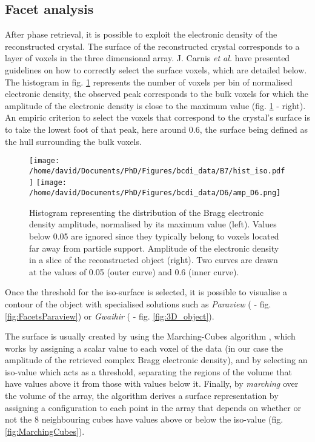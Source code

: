 \subsection{Facet analysis} \label{sec:FacetAnalysis}

After phase retrieval, it is possible to exploit the electronic density of the reconstructed crystal.
The surface of the reconstructed crystal corresponds to a layer of voxels in the three dimensional array.
J. Carnis \textit{et al.} \parencite*{Carnis2019} have presented guidelines on how to correctly select the surface voxels, which are detailed below.
The histogram in fig. \ref{fig:histo} represents the number of voxels per bin of normalised electronic density, the observed peak corresponds to the bulk voxels for which the amplitude of the electronic density is close to the maximum value (fig. \ref{fig:histo} - right).
An empiric criterion to select the voxels that correspond to the crystal's surface is to take the lowest foot of that peak, here around \num{0.6}, the surface being defined as the hull surrounding the bulk voxels.

\begin{figure}[!htb]
   \centering
   \texttt{[image: /home/david/Documents/PhD/Figures/bcdi\_data/B7/hist\_iso.pdf]}
   \texttt{[image: /home/david/Documents/PhD/Figures/bcdi\_data/D6/amp\_D6.png]}
   \caption{
   Histogram representing the distribution of the Bragg electronic density amplitude, normalised by its maximum value (left).
   Values below 0.05 are ignored since they typically belong to voxels located far away from particle support.
   Amplitude of the electronic density in a slice of the reconstructed object (right).
   Two curves are drawn at the values of \num{0.05} (outer curve) and \num{0.6} (inner curve).
   }
   \label{fig:histo}
\end{figure}

Once the threshold for the iso-surface is selected, it is possible to visualise a contour of the object with specialised solutions such as \textit{Paraview} (\cite{Ahrens2001} - fig. \ref{fig:FacetsParaview}) or \textit{Gwaihir} (\cite{Simonne2022} - fig. \ref{fig:3D_object}).

The surface is usually created by using the Marching-Cubes algorithm \parencite{Lorensen1987}, which works by assigning a scalar value to each voxel of the data (in our case the amplitude of the retrieved complex Bragg electronic density), and by selecting an iso-value which acts as a threshold, separating the regions of the volume that have values above it from those with values below it.
Finally, by \textit{marching} over the volume of the array, the algorithm derives a surface representation by assigning a configuration to each point in the array that depends on whether or not the 8 neighbouring cubes have values above or below the iso-value (fig. \ref{fig:MarchingCubes}).

